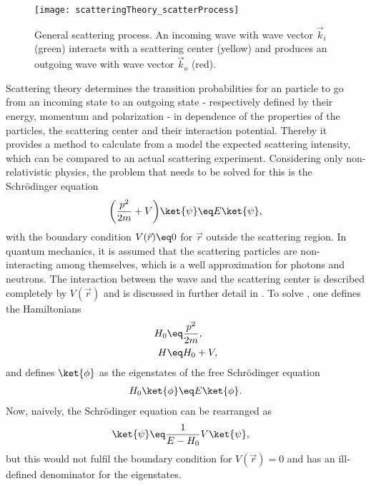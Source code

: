 \documentclass[\main/dresen_thesis.tex]{subfiles}
\begin{document}
\begin{figure}[tb]
  \centering
  \texttt{[image: scatteringTheory\_scatterProcess]}
  \caption{\label{fig:theoreticalBackground:scattering:scatteringTheory:scatteringProcess}General scattering process. An incoming wave with wave vector $\vec{k}_i$ (green) interacts with a scattering center (yellow) and produces an outgoing wave with wave vector $\vec{k}_o$ (red).}
\end{figure}

Scattering theory determines the transition probabilities for an particle to go from an incoming state to an outgoing state - respectively defined by their energy, momentum and polarization - in dependence of the properties of the particles, the scattering center and their interaction potential.
Thereby it provides a method to calculate from a model the expected scattering intensity, which can be compared to an actual scattering experiment.
Considering only non-relativistic physics, the problem that needs to be solved for this is the Schr\"odinger equation
\begin{align}
  \label{eq:theoreticalBackground:scattering:scatteringTheory:schrodingerEquation}
  \bigg(\frac{p^2}{2m} + V \bigg) \ket{\psi} \eq E \ket{\psi},
\end{align}
with the boundary condition $V(\vec{r}) \eq 0$ for $\vec{r}$ outside the scattering region. In quantum mechanics, it is assumed that the scattering particles are non-interacting among themselves, which is a well approximation for photons and neutrons. 
The interaction between the wave and the scattering center is described completely by $V(\vec{r})$ and is discussed in further detail in . 
To solve , one defines the Hamiltonians
\begin{align}
  H_0 &\eq \frac{p^2}{2m},\\
  H &\eq H_0 + V,
\end{align}
and defines $\ket{\phi}$ as the eigenstates of the free Schr\"odinger equation
\begin{align}
  H_0 \ket{\phi} &\eq E \ket{\phi}.\\
\end{align}
Now, naively, the Schr\"odinger equation can be rearranged as
\begin{align}
  \ket{\psi} &\eq \frac{1}{E - H_0} V \ket{\psi},
\end{align}
but this would not fulfil the boundary condition for $V(\vec{r}) = 0$ and has an ill-defined denominator for the eigenstates. 
\end{document}
